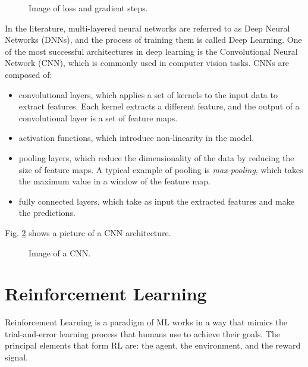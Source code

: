 \begin{figure}[ht]
    \begin{center}
        \fbox{\rule[-.5cm]{0cm}{4cm} \rule[-.5cm]{4cm}{0cm}}
    \end{center}
    \caption{Image of loss and gradient steps.}
    \label{fig:gradient_descent}
\end{figure}



In the literature, multi-layered neural networks are referred to as Deep Neural Networks (DNNs), and the process of training them is called Deep Learning.
One of the most successful architectures in deep learning is the Convolutional Neural Network (CNN), which is commonly used in computer vision tasks.
CNNs are composed of:

\begin{itemize}
    \item convolutional layers, which applies a set of kernels to the input data to extract features.
    Each kernel extracts a different feature, and the output of a convolutional layer is a set of feature maps.
    \item activation functions, which introduce non-linearity in the model.
    \item pooling layers, which reduce the dimensionality of the data by reducing the size of feature maps.
    A typical example of pooling is \textit{max-pooling}, which takes the maximum value in a window of the feature map.
    \item fully connected layers, which take as input the extracted features and make the predictions.
\end{itemize}

Fig. \ref{fig:cnn} shows a picture of a CNN architecture.

\begin{figure}[ht]
    \begin{center}
        \fbox{\rule[-.5cm]{0cm}{4cm} \rule[-.5cm]{4cm}{0cm}}
    \end{center}
    \caption{Image of a CNN.}
    \label{fig:cnn}
\end{figure}



\section{Reinforcement Learning}
\label{sec:rl}

Reinforcement Learning is a paradigm of ML works in a way that mimics the trial-and-error learning process that humans use to achieve their goals.
The principal elements that form RL are: the agent, the environment, and the reward signal.

